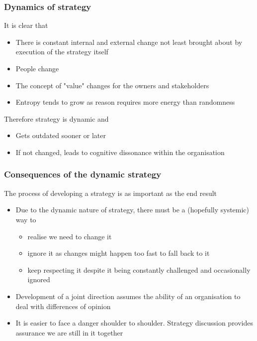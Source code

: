 \begin{frame}[fragile]
  \frametitle{Dynamics of strategy}
It is clear that
  \begin{itemize}
  	\item There is constant internal and external change not least brought about by execution of the strategy itself
	\item People change
	\item The concept of "value" changes for the owners and stakeholders
	\item Entropy tends to grow as reason requires more energy than randomness
  \end{itemize}
Therefore strategy is dynamic and
	\begin{itemize}
		\item Gets outdated sooner or later
		\item If not changed, leads to cognitive dissonance within the organisation
	\end{itemize}
\end{frame}

\begin{frame}[fragile]
  \frametitle{Consequences of the dynamic strategy}
	The process of developing a strategy is as important as the end result
	\begin{itemize}
		\item Due to the dynamic nature of strategy, there must be a (hopefully systemic) way to 
		\begin{itemize}
			\item realise we need to change it
			\item ignore it as changes might happen too fast to fall back to it
			\item keep respecting it despite it being constantly challenged and occasionally ignored
		\end{itemize}
		\item Development of a joint direction assumes the ability of an organisation to deal with differences of opinion
		\item It is easier to face a danger shoulder to shoulder. Strategy discussion provides assurance we are still in it together
	\end{itemize}
\end{frame}

